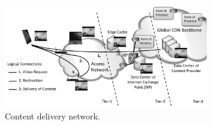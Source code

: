 





\begin{figure}[bt]
\centering
	\includegraphics[width=0.80\textwidth]{aslevel/figs/cdn}
 	\caption{Content delivery network.}
 	\label{fig:aslevel:cdn}
\end{figure}


